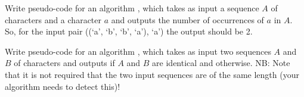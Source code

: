 \documentclass{article}
\begin{document}
\begin{Exercise}

    \Question
    Write pseudo-code for an algorithm , which takes as
    input a sequence $A$ of characters and a character $a$ and outputs the
    number of occurrences of $a$ in $A$. So, for the input pair ((`a', `b', `b',
    `a'), `a') the output should be 2.
    
    \medskip
    \Question
    Write pseudo-code for an algorithm , which takes as
    input two sequences $A$ and $B$ of characters and outputs  if
    $A$ and $B$ are identical and  otherwise. NB: Note that it is
    not required that the two input sequences are of the same length (your
    algorithm needs to detect this)!
    
\end{Exercise}
\end{document}
